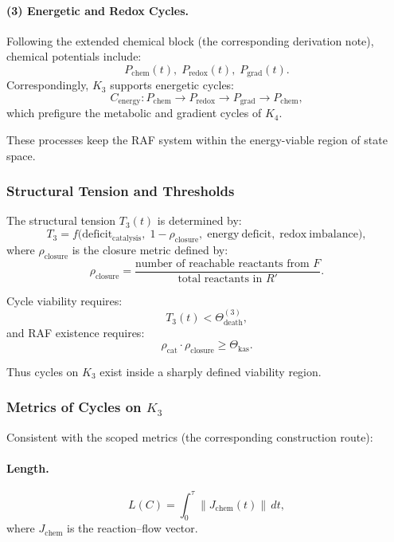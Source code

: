 \paragraph{(3) Energetic and Redox Cycles.}

Following the extended chemical block (the corresponding derivation note),
chemical potentials include:
\[
  P_{\mathrm{chem}}(t),\;
  P_{\mathrm{redox}}(t),\;
  P_{\mathrm{grad}}(t).
\]
Correspondingly, $K_3$ supports energetic cycles:
\[
  C_{\mathrm{energy}}: 
  P_{\mathrm{chem}}\to P_{\mathrm{redox}}
    \to P_{\mathrm{grad}} \to P_{\mathrm{chem}},
\]
which prefigure the metabolic and gradient cycles of $K_4$.

These processes keep the RAF system within the energy-viable region
of state space.

\subsubsection{Structural Tension and Thresholds}

The structural tension $T_3(t)$ is determined by:
\[
  T_3 = 
   f\bigl(
     \mathrm{deficit}_{\mathrm{catalysis}},\;
     1-\rho_{\mathrm{closure}},\;
     \mathrm{energy\ deficit},\;
     \mathrm{redox\ imbalance}
   \bigr),
\]
where $\rho_{\mathrm{closure}}$ is the closure metric defined by:
\[
  \rho_{\mathrm{closure}} =
    \frac{\text{number of reachable reactants from } F}
         {\text{total reactants in } R'}.
\]

Cycle viability requires:
\[
  T_3(t) < \Theta_{\mathrm{death}}^{(3)},
\]
and RAF existence requires:
\[
  \rho_{\mathrm{cat}} \cdot \rho_{\mathrm{closure}}
  \ge \Theta_{\mathrm{kas}}.
\]

Thus cycles on $K_3$ exist inside a sharply defined viability region.

\subsubsection{Metrics of Cycles on \texorpdfstring{$K_3$}{K_3}}

Consistent with the scoped metrics (the corresponding construction route):

\paragraph{Length.}
\[
  L(C) = \int_0^\tau \|J_{\mathrm{chem}}(t)\|\, dt,
\]
where $J_{\mathrm{chem}}$ is the reaction–flow vector.

